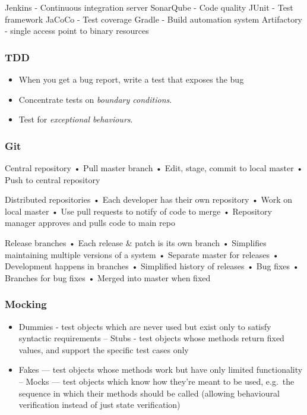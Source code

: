 \documentclass[10pt,a4paper]{article}
\begin{document}
\begin{multicols}{3}
Jenkins - Continuous integration server SonarQube - Code quality JUnit -
Test framework JaCoCo - Test coverage Gradle - Build automation system
Artifactory - single access point to binary resources

\subsubsection{TDD}\label{tdd}

\begin{itemize}
\item
  When you get a bug report, write a test that exposes the bug
\item
  Concentrate tests on \emph{boundary conditions}.
\item
  Test for \emph{exceptional behaviours}.
\end{itemize}

\subsubsection{Git}\label{git}

Central repository • Pull master branch • Edit, stage, commit to local
master • Push to central repository

Distributed repositories • Each developer has their own repository •
Work on local master • Use pull requests to notify of code to merge •
Repository manager approves and pulls code to main repo

Release branches • Each release \& patch is its own branch • Simplifies
maintaining multiple versions of a system • Separate master for releases
• Development happens in branches • Simplified history of releases • Bug
fixes • Branches for bug fixes • Merged into master when fixed

\subsubsection{Mocking}\label{mocking}

\begin{itemize}
\item
  Dummies - test objects which are never used but exist only to satisfy
  syntactic requirements -- Stubs - test objects whose methods return
  fixed values, and support the specific test cases only
\item
  Fakes --- test objects whose methods work but have only limited
  functionality -- Mocks --- test objects which know how they're meant
  to be used, e.g.~the sequence in which their methods should be called
  (allowing behavioural verification instead of just state verification)
\end{itemize}


\end{multicols}
\end{document}

